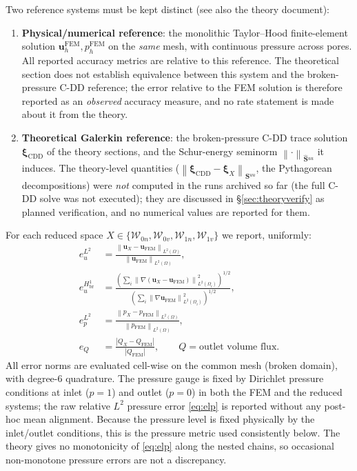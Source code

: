 \documentclass[11pt,a4paper]{article}
\newcommand{\dom}{\Omega}
\newcommand{\pore}[1]{\Omega_{#1}}
\newcommand{\vel}{\bm{u}}
\newcommand{\pres}{p}
\newcommand{\Schur}{\mathbf{S}}
\newcommand{\Shatuu}{\widehat{\Schur}{}^{uu}}
\newcommand{\Wspace}{\mathcal{W}}
\newcommand{\xiX}[1]{\bm{\xi}_{#1}}
\newcommand{\norm}[1]{\left\|#1\right\|}
\newcommand{\abs}[1]{\left|#1\right|}
\begin{document}
Two reference systems must be kept distinct (see also the theory
document):

\begin{enumerate}[label=(\roman*),nosep,leftmargin=*]
\item \textbf{Physical/numerical reference}: the monolithic Taylor--Hood
  finite-element solution
  $\vel_h^{\mathrm{FEM}}, \pres_h^{\mathrm{FEM}}$ on the \emph{same}
  mesh, with continuous pressure across pores.  All reported accuracy
  metrics are relative to this reference.  The theoretical section does
  not establish equivalence between this system and the broken-pressure
  C-DD reference; the error relative to the FEM solution is therefore
  reported as an \emph{observed} accuracy measure, and no rate statement
  is made about it from the theory.
\item \textbf{Theoretical Galerkin reference}: the broken-pressure C-DD
  trace solution $\xiX{\mathrm{CDD}}$ of the theory sections, and the
  Schur-energy seminorm $\norm{\cdot}_{\Shatuu}$ it induces.  The
  theory-level quantities ($\norm{\xiX{\mathrm{CDD}}-\xiX{X}}_{\Shatuu}$,
  the Pythagorean decompositions) were \emph{not} computed in the runs
  archived so far (the full C-DD solve was not executed); they are
  discussed in \S\ref{sec:theoryverify} as planned verification, and no numerical values
  are reported for them.
\end{enumerate}

For each reduced space $X \in \{\Wspace_{0n}, \Wspace_{0v},
\Wspace_{1n}, \Wspace_{1v}\}$ we report, uniformly:
\begin{align}
  e_u^{L^2} &= \frac{\norm{\vel_X - \vel_{\mathrm{FEM}}}_{L^2(\dom)}}
                   {\norm{\vel_{\mathrm{FEM}}}_{L^2(\dom)}}, \label{eq:elu}\\
  e_u^{H^1_{\mathrm{br}}} &= \frac{
      \left(\sum_i \norm{\nabla(\vel_X-\vel_{\mathrm{FEM}})}_{L^2(\pore{i})}^2\right)^{1/2}}
      {\left(\sum_i \norm{\nabla \vel_{\mathrm{FEM}}}_{L^2(\pore{i})}^2\right)^{1/2}},
      \label{eq:ehu}\\
  e_p^{L^2} &= \frac{\norm{\pres_X - \pres_{\mathrm{FEM}}}_{L^2(\dom)}}
                   {\norm{\pres_{\mathrm{FEM}}}_{L^2(\dom)}}, \label{eq:elp}\\
  e_Q &= \frac{\abs{Q_X - Q_{\mathrm{FEM}}}}{\abs{Q_{\mathrm{FEM}}}},
       \qquad Q = \text{outlet volume flux}. \label{eq:eq}
\end{align}
All error norms are evaluated cell-wise on the common mesh (broken
domain), with degree-6 quadrature.  The pressure gauge is fixed by
Dirichlet pressure conditions at inlet ($p=1$) and outlet ($p=0$) in
both the FEM and the reduced systems; the raw relative $L^2$ pressure
error \eqref{eq:elp} is reported without any post-hoc mean alignment.
Because the pressure level is fixed physically by the inlet/outlet
conditions, this is the pressure metric used consistently below.  The
theory gives no monotonicity of \eqref{eq:elp} along the nested chains,
so occasional non-monotone pressure errors are not a discrepancy.
\end{document}
